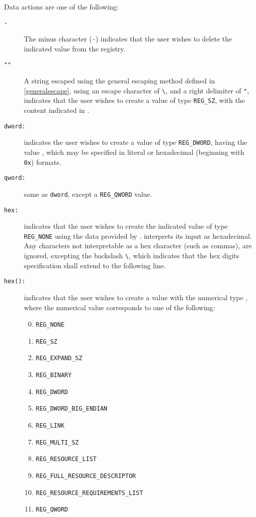 Data actions are one of the following:
\begin{description}
\item[\texttt{-}] The minus character (\verb|-|) indicates that the user wishes
to delete the indicated value from the registry.
\item[\texttt{""}] A string escaped using the general escaping
method defined in \ref{generalescape}, using an escape character of \verb|\|, and a right
delimiter of \verb|"|, indicates that the user wishes to create a value of type
\verb|REG_SZ|, with the content indicated in .
\item[\texttt{dword:}] indicates the user wishes to create a value
of type \verb|REG_DWORD|, having the value , which may be specified in
literal or hexadecimal (beginning with \verb|0x|) formats.
\item[\texttt{qword:}] same as \verb|dword|, except a
\verb|REG_QWORD| value.
\item[\texttt{hex:}] indicates that the user wishes to create the
indicated value of type \verb|REG_NONE| using the data provided by
.  interprets its input as hexadecimal. Any
characters not interpretable as a hex character (such as commas), are ignored,
excepting the backslash \verb|\|, which indicates that the hex digits
specification shall extend to the following line.
\item[\texttt{hex():}] indicates that the user wishes
to create a value with the numerical type , where the numerical value
corresponds to one of the following:
\begin{enumerate}
\setcounter{enumi}{-1}
    \item \verb|REG_NONE|
    \item \verb|REG_SZ|
    \item \verb|REG_EXPAND_SZ|
    \item \verb|REG_BINARY|
    \item \verb|REG_DWORD|
    \item \verb|REG_DWORD_BIG_ENDIAN|
    \item \verb|REG_LINK|
    \item \verb|REG_MULTI_SZ|
    \item \verb|REG_RESOURCE_LIST|
    \item \verb|REG_FULL_RESOURCE_DESCRIPTOR|
    \item \verb|REG_RESOURCE_REQUIREMENTS_LIST|
    \item \verb|REG_QWORD|

\end{enumerate}
\end{description}
